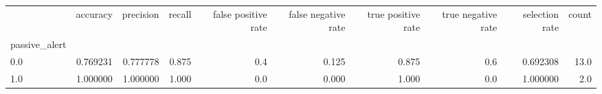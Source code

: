 \begin{tabular}{lrrrrrrrrr}
\toprule
{} &  accuracy &  precision &  recall &  false positive rate &  false negative rate &  true positive rate &  true negative rate &  selection rate &  count \\
passive\_alert &           &            &         &                      &                      &                     &                     &                 &        \\
\midrule
0.0           &  0.769231 &   0.777778 &   0.875 &                  0.4 &                0.125 &               0.875 &                 0.6 &        0.692308 &   13.0 \\
1.0           &  1.000000 &   1.000000 &   1.000 &                  0.0 &                0.000 &               1.000 &                 0.0 &        1.000000 &    2.0 \\
\bottomrule
\end{tabular}
